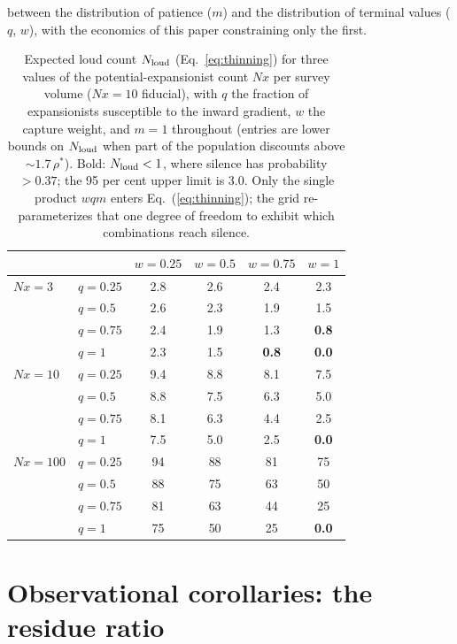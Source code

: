 \documentclass[11pt]{article}
\begin{document}
between the distribution of patience ($m$) and the distribution of terminal values ($q$, $w$), with the economics of this paper constraining only the first.

\begin{table}[tbp]
\centering
\caption{Expected loud count $N_{\rm loud}$ (Eq.~\ref{eq:thinning}) for three values of the potential-expansionist count $N x$ per survey volume ($N x = 10$ fiducial), with $q$ the fraction of expansionists susceptible to the inward gradient, $w$ the capture weight, and $m = 1$ throughout (entries are lower bounds on $N_{\rm loud}$ when part of the population discounts above $\sim$$1.7\,\rho^{*}$). Bold: $N_{\rm loud} < 1$, where silence has probability $>0.37$; the 95 per cent upper limit is $3.0$. Only the single product $wqm$ enters Eq.~(\ref{eq:thinning}); the grid re-parameterizes that one degree of freedom to exhibit which combinations reach silence.}
\label{tab:thinning}
\small
\begin{tabular}{llcccc}
\toprule
 & & $w = 0.25$ & $w = 0.5$ & $w = 0.75$ & $w = 1$ \\
\midrule
$N x = 3$
 & $q = 0.25$ & 2.8 & 2.6 & 2.4 & 2.3 \\
 & $q = 0.5$  & 2.6 & 2.3 & 1.9 & 1.5 \\
 & $q = 0.75$ & 2.4 & 1.9 & 1.3 & \textbf{0.8} \\
 & $q = 1$    & 2.3 & 1.5 & \textbf{0.8} & \textbf{0.0} \\
\midrule
$N x = 10$
 & $q = 0.25$ & 9.4 & 8.8 & 8.1 & 7.5 \\
 & $q = 0.5$  & 8.8 & 7.5 & 6.3 & 5.0 \\
 & $q = 0.75$ & 8.1 & 6.3 & 4.4 & 2.5 \\
 & $q = 1$    & 7.5 & 5.0 & 2.5 & \textbf{0.0} \\
\midrule
$N x = 100$
 & $q = 0.25$ & 94 & 88 & 81 & 75 \\
 & $q = 0.5$  & 88 & 75 & 63 & 50 \\
 & $q = 0.75$ & 81 & 63 & 44 & 25 \\
 & $q = 1$    & 75 & 50 & 25 & \textbf{0.0} \\
\bottomrule
\end{tabular}
\end{table}

\section{Observational corollaries: the residue ratio}
\label{sec:residues}
\end{document}
